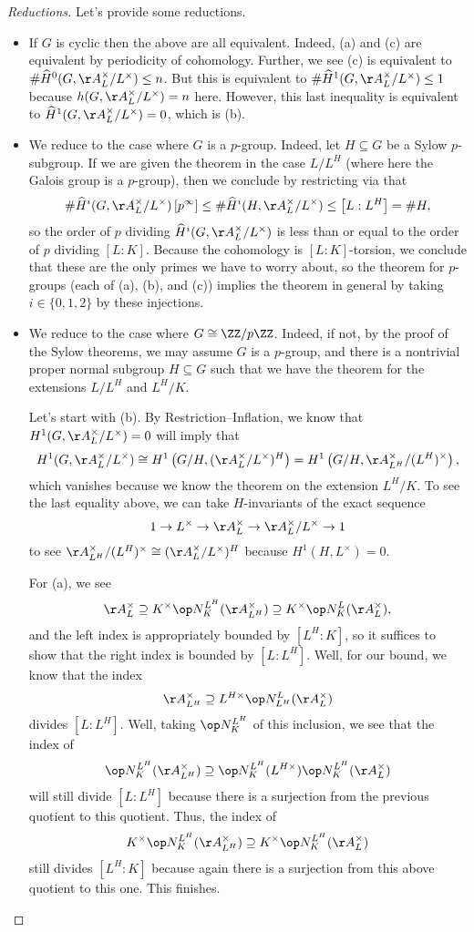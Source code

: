 \documentclass[../notes.tex]{subfiles}
\begin{document}
\begin{proof}[Reductions]
	Let's provide some reductions.
	\begin{itemize}
		\item If $G$ is cyclic then the above are all equivalent. Indeed, (a) and (c) are equivalent by periodicity of cohomology. Further, we see (c) is equivalent to $\#\widehat H^0(G,\AA_L^\times/L^\times)\le n$. But this is equivalent to $\#\widehat H^1(G,\AA_L^\times/L^\times)\le1$ because $h(G,\AA_L^\times/L^\times)=n$ here. However, this last inequality is equivalent to $\widehat H^1(G,\AA_L^\times/L^\times)=0$, which is (b).
		\item We reduce to the case where $G$ is a $p$-group. Indeed, let $H\subseteq G$ be a Sylow $p$-subgroup. If we are given the theorem in the case $L/L^H$ (where here the Galois group is a $p$-group), then we conclude by restricting via  that
		\[\#\widehat H^i(G,\AA_L^\times/L^\times)\left[p^\infty\right]\le\#\widehat H^i(H,\AA_L^\times/L^\times)\le\left[L:L^H\right]=\#H,\]
		so the order of $p$ dividing $\widehat H^i(G,\AA_L^\times/L^\times)$ is less than or equal to the order of $p$ dividing $[L:K]$. Because the cohomology is $[L:K]$-torsion, we conclude that these are the only primes we have to worry about, so the theorem for $p$-groups (each of (a), (b), and (c)) implies the theorem in general by taking $i\in\{0,1,2\}$ by these injections.
		\item We reduce to the case where $G\cong\ZZ/p\ZZ$. Indeed, if not, by the proof of the Sylow theorems, we may assume $G$ is a $p$-group, and there is a nontrivial proper normal subgroup $H\subseteq G$ such that we have the theorem for the extensions $L/L^H$ and $L^H/K$.

		Let's start with (b). By Restriction--Inflation, we know that $H^1(G,\AA_L^\times/L^\times)=0$ will imply that
		\[H^1(G,\AA_L^\times/L^\times)\cong H^1\left(G/H,(\AA_L^\times/L^\times)^H\right)=H^1\left(G/H,\AA_{L^H}^\times/(L^H)^\times\right),\]
		which vanishes because we know the theorem on the extension $L^H/K$. To see the last equality above, we can take $H$-invariants of the exact sequence
		\[1\to L^\times\to\AA_L^\times\to\AA_L^\times/L^\times\to1\]
		to see $\AA_{L^H}^\times/(L^H)^\times\cong(\AA_L^\times/L^\times)^H$ because $H^1(H,L^\times)=0$.

		For (a), we see
		\[\AA_L^\times\supseteq K^\times\op N_K^{L^H}(\AA_{L^H}^\times)\supseteq K^\times\op N^L_K(\AA_L^\times),\]
		and the left index is appropriately bounded by $[L^H:K]$, so it suffices to show that the right index is bounded by $[L:L^H]$. Well, for our bound, we know that the index
		\[\AA_{L^H}^\times\supseteq L^{H\times}\op N^L_{L^H}(\AA_L^\times)\]
		divides $[L:L^H]$. Well, taking $\op N^{L^H}_K$ of this inclusion, we see that the index of
		\[\op N^{L^H}_K(\AA_{L^H}^\times)\supseteq\op N^{L^H}_K(L^{H\times})\op N^{L^H}_K(\AA_L^\times)\]
		will still divide $[L:L^H]$ because there is a surjection from the previous quotient to this quotient. Thus, the index of
		\[K^\times\op N^{L^H}_K(\AA_{L^H}^\times)\supseteq K^\times\op N^{L^H}_K(\AA_L^\times)\]
		still divides $[L^H:K]$ because again there is a surjection from this above quotient to this one. This finishes.
		

\end{itemize}
\end{proof}
\end{document}

